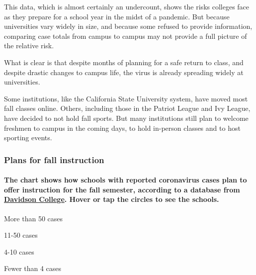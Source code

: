 This data, which is almost certainly an undercount, shows the risks
colleges face as they prepare for a school year in the midst of a
pandemic. But because universities vary widely in size, and because some
refused to provide information, comparing case totals from campus to
campus may not provide a full picture of the relative risk.

What is clear is that despite months of planning for a safe return to
class, and despite drastic changes to campus life, the virus is already
spreading widely at universities.

Some institutions, like the California State University system, have
moved most fall classes online. Others, including those in the Patriot
League and Ivy League, have decided to not hold fall sports. But many
institutions still plan to welcome freshmen to campus in the coming
days, to hold in-person classes and to host sporting events.

\hypertarget{plans-for-fall-instruction}{%
\subsubsection{Plans for fall
instruction}\label{plans-for-fall-instruction}}

\hypertarget{the-chart-shows-how-schools-with-reported-coronavirus-cases-plan-to-offer-instruction-for-the-fall-semester-according-to-a-database-from-davidson-college-hover-or-tap-the-circles-to-see-the-schools}{%
\paragraph{\texorpdfstring{The chart shows how schools with reported
coronavirus cases plan to offer instruction for the fall semester,
according to a database from
\href{https://collegecrisis.shinyapps.io/dashboard/}{Davidson College}.
Hover or tap the circles to see the
schools.}{The chart shows how schools with reported coronavirus cases plan to offer instruction for the fall semester, according to a database from Davidson College. Hover or tap the circles to see the schools.}}\label{the-chart-shows-how-schools-with-reported-coronavirus-cases-plan-to-offer-instruction-for-the-fall-semester-according-to-a-database-from-davidson-college-hover-or-tap-the-circles-to-see-the-schools}}

More than 50 cases

11-50 cases

4-10 cases

Fewer than 4 cases

